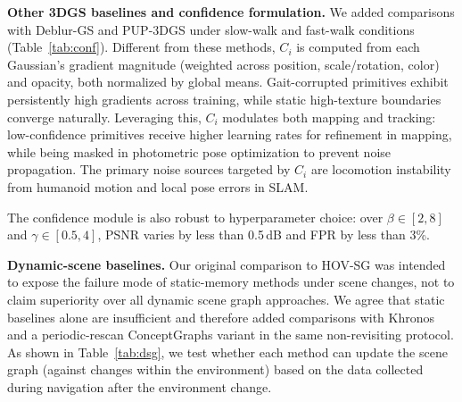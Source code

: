 \documentclass[conference]{IEEEtran}
\begin{document}
\textbf{Other 3DGS baselines and confidence formulation.}
We added comparisons with Deblur-GS and PUP-3DGS under slow-walk and fast-walk conditions (Table~\ref{tab:conf}). Different from these methods, $C_i$ is computed from each Gaussian's gradient magnitude (weighted across position, scale/rotation, color) and opacity, both normalized by global means.
 Gait-corrupted primitives exhibit persistently high gradients across training, while static high-texture boundaries converge naturally. Leveraging this, $C_i$ modulates both mapping and tracking: low-confidence primitives receive higher learning rates for refinement in mapping, while being masked in photometric pose optimization to prevent noise propagation. The primary noise sources targeted by $C_i$ are locomotion instability from humanoid motion and local pose errors in SLAM.




\begin{table}[h]
\centering
\caption{ Rendering results under slow (S-) and fast (F-) walk.}
\label{tab:conf}
\setlength{\tabcolsep}{2.5pt} 
\end{table}

The confidence module is also robust to hyperparameter choice: over $\beta\!\in\![2,8]$ and $\gamma\!\in\![0.5,4]$, PSNR varies by less than 0.5\,dB and FPR by less than 3\%.





\textbf{Dynamic-scene baselines.}
Our original comparison to HOV-SG was intended to expose the failure mode of static-memory methods under scene changes, not to claim superiority over all dynamic scene graph approaches. We agree that static baselines alone are insufficient and therefore added comparisons with Khronos and a periodic-rescan ConceptGraphs variant in the same non-revisiting protocol. As shown in Table~\ref{tab:dsg}, we test whether each method can update the scene graph (against changes within the environment) based on the data collected during navigation after the environment change.
\end{document}
